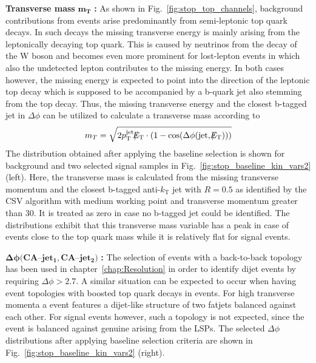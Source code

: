 \begin{description}
 \item \textbf{Transverse mass} $\mathbf{m_T}$ \textbf{:} As shown in Fig.~\ref{fig:stop_top_channels}, background contributions from \ttbar events arise predominantly from semi-leptonic top quark decays. In such decays the missing transverse energy is mainly arising from the leptonically decaying top quark. This is caused by neutrinos from the decay of the W boson and becomes even more prominent for lost-lepton events in which also the undetected lepton contributes to the missing energy. In both cases however, the missing energy is expected to point into the direction of the leptonic top decay which is supposed to be accompanied by a b-quark jet also stemming from the top decay. Thus, the missing transverse energy and the closest b-tagged jet in $\Delta \phi$ can be utilized to calculate a transverse mass according to
\begin{equation}
m_T = \sqrt{2 p_{\text{T}}^\mathrm{jet}\slash\mkern-12mu{E}_{\text{T}} \cdot (1-\mathrm{cos}(\Delta \phi(\mathrm{jet}, \slash\mkern-12mu{E}_{\text{T}})))}
\end{equation}   
The distribution obtained after applying the baseline selection is shown for background and two selected signal samples in Fig.~\ref{fig:stop_baseline_kin_vars2} (left). Here, the transverse mass is calculated from the missing transverse momentum and the closest b-tagged anti-$k_\mathrm{T}$ jet with $R = 0.5$ as identified by the CSV algorithm with medium working point and transverse momentum greater than 30\gev. It is treated as zero in case no b-tagged jet could be identified. The distributions exhibit that this transverse mass variable has a peak in case of \ttbar events close to the top quark mass while it is relatively flat for signal events. 
 \item $\mathbf{\Delta \phi(CA}$--$\mathbf{jet_1, CA}$--$\mathbf{jet_2)}$ \textbf{:} The selection of events with a back-to-back topology has been used in chapter~\ref{chap:Resolution} in order to identify dijet events by requiring $\Delta \phi > 2.7$. A similar situation can be expected to occur when having event topologies with boosted top quark decays in \ttbar events. For high transverse momenta a \ttbar event features a dijet-like structure of two fatjets balanced against each other. For signal events however, such a topology is not expected, since the event is balanced against genuine \met arising from the LSPs. The selected $\Delta \phi$ distributions after applying baseline selection criteria are shown in Fig.~\ref{fig:stop_baseline_kin_vars2} (right).  
\end{description}
